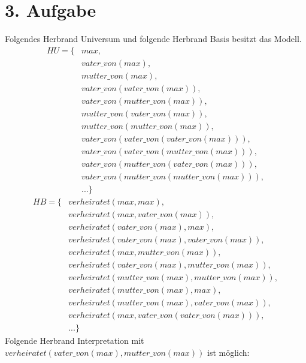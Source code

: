 \documentclass[11pt,a4paper]{article}
\begin{document}
\section*{3. Aufgabe}
Folgendes Herbrand Universum und folgende Herbrand Basis besitzt das Modell.
\begin{equation*}
\begin{split}
HU = \{ & max, \\
        & vater\_von(max), \\
        & mutter\_von(max), \\
        & vater\_von(vater\_von(max)), \\
        & vater\_von(mutter\_von(max)), \\
        & mutter\_von(vater\_von(max)),\\
        & mutter\_von(mutter\_von(max)),\\
        & vater\_von(vater\_von(vater\_von(max))),\\
        & vater\_von(vater\_von(mutter\_von(max))),\\
        & vater\_von(mutter\_von(vater\_von(max))),\\
        & vater\_von(mutter\_von(mutter\_von(max))),\\
        & ... \}
\end{split}
\end{equation*}
\begin{equation*}
\begin{split}
HB = \{ & verheiratet(max,max),\\
        & verheiratet(max,vater\_von(max)),\\
        & verheiratet(vater\_von(max),max),\\
        & verheiratet(vater\_von(max),vater\_von(max)),\\
        & verheiratet(max,mutter\_von(max)),\\
        & verheiratet(vater\_von(max),mutter\_von(max)),\\
        & verheiratet(mutter\_von(max),mutter\_von(max)),\\
        & verheiratet(mutter\_von(max),max),\\
        & verheiratet(mutter\_von(max),vater\_von(max)),\\
        & verheiratet(max,vater\_von(vater\_von(max))),\\
        & ... \}
\end{split}
\end{equation*}
Folgende Herbrand Interpretation mit $verheiratet(vater\_von(max),mutter\_von(max))$ ist m\"oglich:
\end{document}
